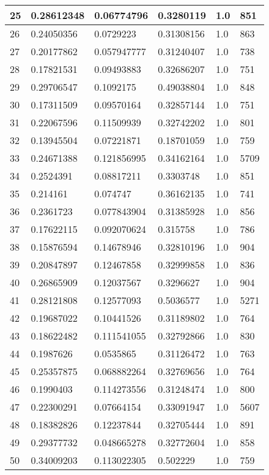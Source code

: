 \begin{longtable}{|l|l|l|l|l|l|}
25 & 0.28612348 & 0.06774796 & 0.3280119 & 1.0 & 851 \\ \hline 
26 & 0.24050356 & 0.0729223 & 0.31308156 & 1.0 & 863 \\ \hline 
27 & 0.20177862 & 0.057947777 & 0.31240407 & 1.0 & 738 \\ \hline 
28 & 0.17821531 & 0.09493883 & 0.32686207 & 1.0 & 751 \\ \hline 
29 & 0.29706547 & 0.1092175 & 0.49038804 & 1.0 & 848 \\ \hline 
30 & 0.17311509 & 0.09570164 & 0.32857144 & 1.0 & 751 \\ \hline 
31 & 0.22067596 & 0.11509939 & 0.32742202 & 1.0 & 801 \\ \hline 
32 & 0.13945504 & 0.07221871 & 0.18701059 & 1.0 & 759 \\ \hline 
33 & 0.24671388 & 0.121856995 & 0.34162164 & 1.0 & 5709 \\ \hline 
34 & 0.2524391 & 0.08817211 & 0.3303748 & 1.0 & 851 \\ \hline 
35 & 0.214161 & 0.074747 & 0.36162135 & 1.0 & 741 \\ \hline 
36 & 0.2361723 & 0.077843904 & 0.31385928 & 1.0 & 856 \\ \hline 
37 & 0.17622115 & 0.092070624 & 0.315758 & 1.0 & 786 \\ \hline 
38 & 0.15876594 & 0.14678946 & 0.32810196 & 1.0 & 904 \\ \hline 
39 & 0.20847897 & 0.12467858 & 0.32999858 & 1.0 & 836 \\ \hline 
40 & 0.26865909 & 0.12037567 & 0.3296627 & 1.0 & 904 \\ \hline 
41 & 0.28121808 & 0.12577093 & 0.5036577 & 1.0 & 5271 \\ \hline 
42 & 0.19687022 & 0.10441526 & 0.31189802 & 1.0 & 764 \\ \hline 
43 & 0.18622482 & 0.111541055 & 0.32792866 & 1.0 & 830 \\ \hline 
44 & 0.1987626 & 0.0535865 & 0.31126472 & 1.0 & 763 \\ \hline 
45 & 0.25357875 & 0.068882264 & 0.32769656 & 1.0 & 764 \\ \hline 
46 & 0.1990403 & 0.114273556 & 0.31248474 & 1.0 & 800 \\ \hline 
47 & 0.22300291 & 0.07664154 & 0.33091947 & 1.0 & 5607 \\ \hline 
48 & 0.18382826 & 0.12237844 & 0.32705444 & 1.0 & 891 \\ \hline 
49 & 0.29377732 & 0.048665278 & 0.32772604 & 1.0 & 858 \\ \hline 
50 & 0.34009203 & 0.113022305 & 0.502229 & 1.0 & 759 \\ \hline 
\end{longtable}